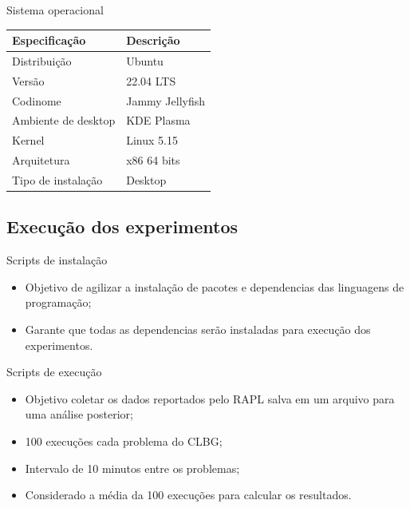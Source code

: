 \begin{frame}{Sistema operacional}
    \centering
    \begin{table}[h]
        \centering
        \begin{tabular}{l|l}
            \textbf{Especificação} & \textbf{Descrição} \\
            \toprule
            Distribuição & Ubuntu \\
            \hline
            Versão & 22.04 LTS  \\
            \hline
            Codinome & Jammy Jellyfish \\
            \hline
            Ambiente de desktop & KDE Plasma \\
            \hline
            Kernel & Linux 5.15 \\
            \hline
            Arquitetura & x86 64 bits \\
            \hline
            Tipo de instalação & Desktop\\
        \end{tabular}
    \end{table}
\end{frame}

\subsection{Execução dos experimentos}

\begin{frame}{Scripts de instalação}
    \begin{itemize}
        \item Objetivo de agilizar a instalação de pacotes e dependencias das linguagens de programação;
        \item Garante que todas as dependencias serão instaladas para execução dos experimentos.
    \end{itemize}
\end{frame}

\begin{frame}{Scripts de execução}
    \begin{itemize}
        \item Objetivo coletar os dados reportados pelo RAPL salva em um arquivo para uma análise posterior;
        \item 100 execuções cada problema do CLBG;
        \item Intervalo de 10 minutos entre os problemas;
        \item Considerado a média da 100 execuções para calcular os resultados.
    \end{itemize}
\end{frame}

